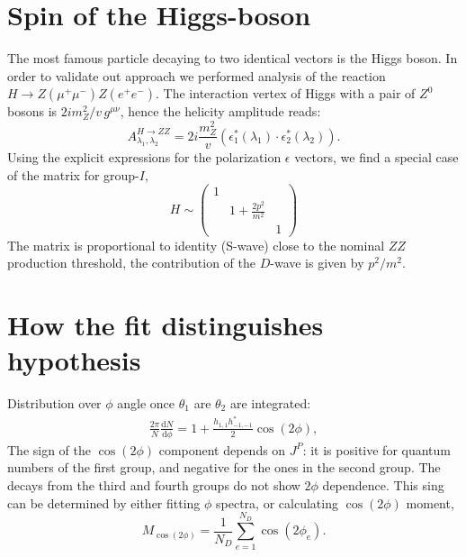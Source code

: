 \documentclass[prd,preprintnumbers,floatfix,
nofootinbib,superscriptaddress]{revtex4}
\newcommand{\diff}{\mathrm{d}}
\newcommand{\I}{\ensuremath{I}}
\begin{document}
\section{Spin of the Higgs-boson}
The most famous particle decaying to two identical vectors is the Higgs boson.
In order to validate out approach we performed analysis of the reaction $H\to Z(\mu^+\mu^-)Z(e^+e^-)$.
The interaction vertex of Higgs with a pair of $Z^0$ bosons is $2i m_Z^2/v\,g^{\mu\nu}$,
hence the helicity amplitude reads:
\begin{equation} \label{eq:HZZ}
  A^{H\to ZZ}_{\lambda_1,\lambda_2} = 2i\frac{m_Z^2}{v} (\epsilon_1^*(\lambda_1)\cdot\epsilon_2^*(\lambda_2)).
\end{equation}
Using the explicit expressions for the polarization $\epsilon$ vectors,
we find a special case of the matrix for group-$\I$,
\begin{equation}
  H \sim \begin{pmatrix}
    1 & &\\
    & 1+\frac{2p^2}{m^2} &\\
    & & 1
\end{pmatrix}
\end{equation}
The matrix is proportional to identity (S-wave) close to the nominal $ZZ$ production threshold,
the contribution of the $D$-wave is given by $p^2/m^2$.


\section{How the fit distinguishes hypothesis}

Distribution over $\phi$ angle once $\theta_1$ are $\theta_2$ are integrated:
\begin{align}
  \frac{2\pi}{N}\frac{\diff N}{\diff \phi} = 1
   + \frac{h_{1,1} h_{-1,-1}^*}{2} \cos(2 \phi),
\end{align}
The sign of the $\cos(2\phi)$ component depends on $J^P$: it is positive for quantum numbers of the first group, and negative for the ones in the second group.
The decays from the third and fourth groups do not show $2\phi$ dependence.
This sing can be determined by either fitting $\phi$ spectra, or calculating $\cos(2\phi)$ moment,
\begin{equation}
  M_{\cos(2\phi)} = \frac{1}{N_D}\sum_{e=1}^{N_D} \cos(2\phi_e).
\end{equation}
\end{document}
